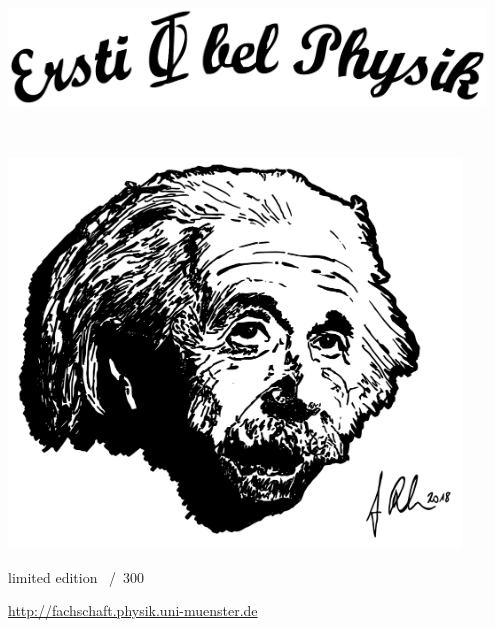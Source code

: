\begin{titlepage}
	\begin{center}
		{\LARGE
		\fibeltitel}

		\vspace{0.5cm}
		\includegraphics[width=0.95\textwidth]{res/cover_schriftzug.pdf}

		{\huge
		\fibelsemester~\fibeljahr}

		\vspace{0.5cm}
		\includegraphics[width=0.9\textwidth]{res/cover_einstein.pdf}
	\end{center}

	\LARGE
	limited edition \underline{\fontsize{32pt}{1em}}~/~300
	
	\vspace{2cm}
	\centering
	\url{http://fachschaft.physik.uni-muenster.de}
\end{titlepage}
\restoregeometry
